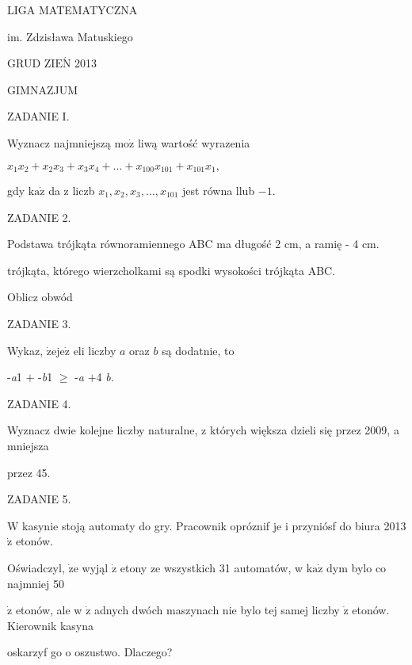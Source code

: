 \documentclass[a4paper,12pt]{article}
\begin{document}
LIGA MATEMATYCZNA

im. Zdzisława Matuskiego

GRUD Z$\mathrm{I}\mathrm{E}\acute{\mathrm{N}}$ 2013

GIMNAZJUM

ZADANIE I.

Wyznacz najmniejszą $\mathrm{m}\mathrm{o}\dot{\mathrm{z}}$ liwą wartość wyrazenia

$x_{1}x_{2}+x_{2}x_{3}+x_{3}x_{4}+\ldots+x_{100}x_{101}+x_{101}x_{1},$

gdy $\mathrm{k}\mathrm{a}\dot{\mathrm{z}}$ da z liczb $x_{1}, x_{2}, x_{3}, \ldots, x_{101}$ jest równa llub $-1.$

ZADANIE 2.

Podstawa trójkąta równoramiennego ABC ma długość 2 cm, a ramię - 4 cm.

trójkąta, którego wierzcholkami są spodki wysokości trójkąta ABC.

Oblicz obwód

ZADANIE 3.

Wykaz, $\dot{\mathrm{z}}\mathrm{e}\mathrm{j}\mathrm{e}\dot{\mathrm{z}}$ eli liczby $a$ oraz $b$ są dodatnie, to

-{\it a}1 $+$ -{\it b}1 $\geq$ -{\it a} $+$4 {\it b}.

ZADANIE 4.

Wyznacz dwie kolejne liczby naturalne, z których większa dzieli się przez 2009, a mniejsza

przez 45.

ZADANIE 5.

$\mathrm{W}$ kasynie stoją automaty do gry. Pracownik opróznif je i przyniósf do biura 2013 $\dot{\mathrm{z}}$ etonów.

Oświadczyl, $\dot{\mathrm{z}}\mathrm{e}$ wyjąl $\dot{\mathrm{z}}$ etony ze wszystkich 31 automatów, w $\mathrm{k}\mathrm{a}\dot{\mathrm{z}}$ dym bylo co najmniej 50

$\dot{\mathrm{z}}$ etonów, ale w $\dot{\mathrm{z}}$ adnych dwóch maszynach nie bylo tej samej liczby $\dot{\mathrm{z}}$ etonów. Kierownik kasyna

oskarzyf go o oszustwo. Dlaczego?
\end{document}
